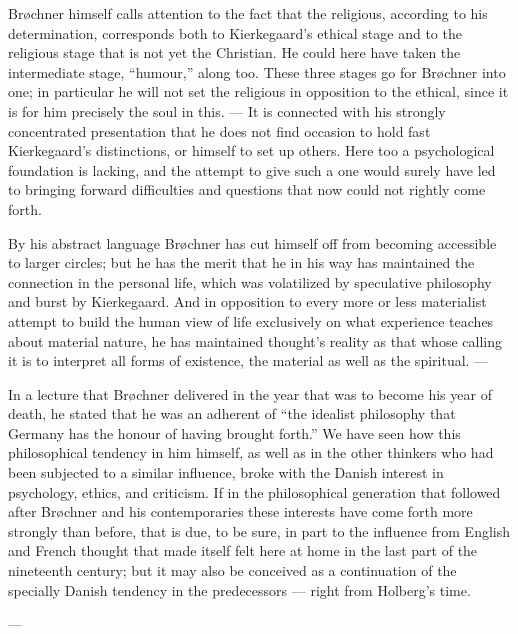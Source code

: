 \documentclass[12pt,a4paper]{book}
\newcommand{\opage}[1]{\marginnote{\footnotesize\textit{[#1]}}}
\begin{document}
Brøchner himself calls attention to the fact that the religious, according to his determination,
corresponds both to Kierkegaard's ethical stage and to the religious stage that is not yet the
Christian. He could here have taken the intermediate \opage{206}stage, ``humour,'' along too. These three
stages go for Brøchner into one; in particular he will not set the religious in opposition to the
ethical, since it is for him precisely the soul in this. --- It is connected with his strongly
concentrated presentation that he does not find occasion to hold fast Kierkegaard's distinctions,
or himself to set up others. Here too a psychological foundation is lacking, and the attempt to
give such a one would surely have led to bringing forward difficulties and questions that now
could not rightly come forth.

By his abstract language Brøchner has cut himself off from becoming accessible to larger circles;
but he has the merit that he in his way has maintained the connection in the personal life, which
was volatilized by speculative philosophy and burst by Kierkegaard. And in opposition to every
more or less materialist attempt to build the human view of life exclusively on what experience
teaches about material nature, he has maintained thought's reality as that whose calling it is to
interpret all forms of existence, the material as well as the spiritual. ---

In a lecture that Brøchner delivered in the year that was to become his year of death, he stated
that he was an adherent of ``the idealist philosophy that Germany has the honour of having brought
forth.'' We have seen how this philosophical tendency in him himself, as well as in the other
thinkers who had been subjected to a similar influence, broke with the Danish interest in
psychology, ethics, and criticism. If in the philosophical generation that followed after Brøchner
and his contemporaries these interests have come forth more strongly than before, that is due, to
be sure, in part to the influence from English and French thought that made itself felt here at
home in the last part of the nineteenth century; but it may also be conceived as a continuation of
the specially Danish tendency in the predecessors --- right from Holberg's time.

\begin{center}---\end{center}
\end{document}
